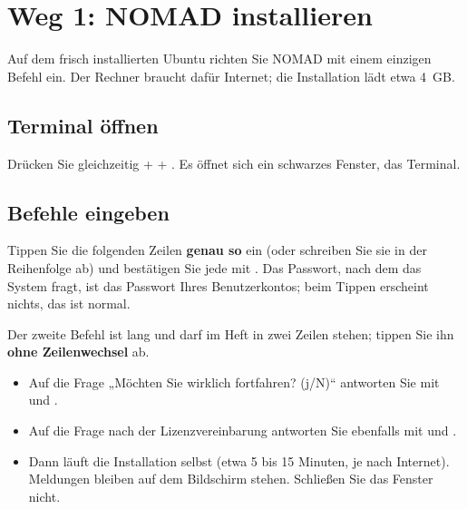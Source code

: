 \chapter{Weg 1: NOMAD installieren}


Auf dem frisch installierten Ubuntu richten Sie NOMAD mit einem einzigen Befehl ein. Der Rechner braucht dafür Internet; die Installation lädt etwa 4~GB.

\section{Terminal öffnen}
Drücken Sie gleichzeitig  +  + . Es öffnet sich ein schwarzes Fenster, das Terminal.

\section{Befehle eingeben}
Tippen Sie die folgenden Zeilen \textbf{genau so} ein (oder schreiben Sie sie in der Reihenfolge ab) und bestätigen Sie jede mit . Das Passwort, nach dem das System fragt, ist das Passwort Ihres Benutzerkontos; beim Tippen erscheint nichts, das ist normal.

Der zweite Befehl ist lang und darf im Heft in zwei Zeilen stehen; tippen Sie ihn \textbf{ohne Zeilenwechsel} ab.


\begin{itemize}[leftmargin=1.5em,itemsep=3pt]
\item Auf die Frage „Möchten Sie wirklich fortfahren? (j/N)“ antworten Sie mit  und .
\item Auf die Frage nach der Lizenzvereinbarung antworten Sie ebenfalls mit  und .
\item Dann läuft die Installation selbst (etwa 5 bis 15 Minuten, je nach Internet). Meldungen bleiben auf dem Bildschirm stehen. Schließen Sie das Fenster nicht.
\end{itemize}


